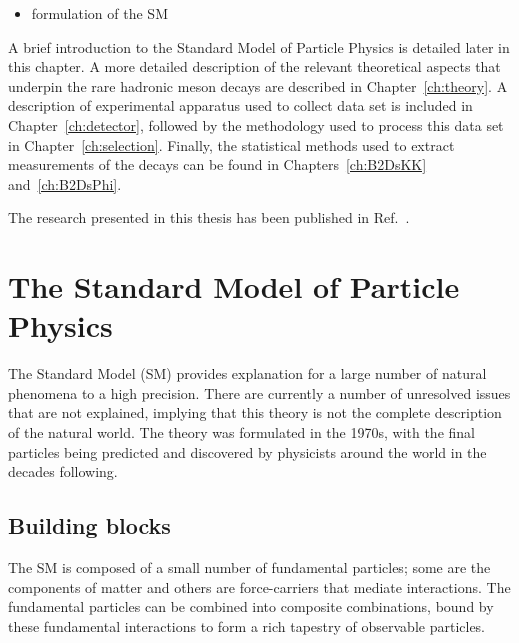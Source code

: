 {\color{Red}
\begin{itemize}
\item formulation of the SM
\end{itemize}}





A brief introduction to the Standard Model of Particle Physics is detailed later in this chapter. A more detailed description of the relevant theoretical aspects that underpin the rare hadronic \B meson decays are described in Chapter~\ref{ch:theory}. A description of experimental apparatus used to collect data set is included in Chapter~\ref{ch:detector}, followed by the methodology used to process this data set in Chapter~\ref{ch:selection}. Finally, the statistical methods used to extract measurements of the decays can be found in Chapters~\ref{ch:B2DsKK} and~\ref{ch:B2DsPhi}.


The research presented in this thesis has been published in Ref.~\cite{LHCb-PAPER-2017-032}. 



\section{The Standard Model of Particle Physics}

The Standard Model (SM) provides explanation for a large number of natural phenomena to a high precision. There are currently a number of unresolved issues that are not explained, implying that this theory is not the complete description of the natural world. The theory was formulated in the 1970s, with the final particles being predicted and discovered by physicists around the world in the decades following.

\subsection{Building blocks}

The SM is composed of a small number of fundamental particles; some are the components of matter and others are force-carriers that mediate interactions. The fundamental particles can be combined into composite combinations, bound by these fundamental interactions to form a rich tapestry of observable particles.

